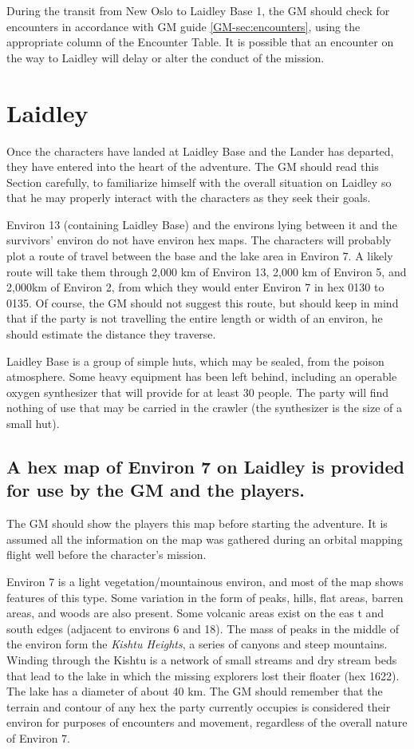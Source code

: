 During the transit from New Oslo to Laidley Base 1, the GM should
check for encounters in accordance with GM guide
\ref{GM-sec:encounters}, using the appropriate column of the Encounter
Table. It is possible that an encounter on the way to Laidley will
delay or alter the conduct of the mission.


\section{Laidley}
\label{sec:laidley}

Once the characters have landed at Laidley Base and the Lander has
departed, they have entered into the heart of the adventure. The GM
should read this Section carefully, to familiarize himself with the
overall situation on Laidley so that he may properly interact with the
characters as they seek their goals.

Environ 13 (containing Laidley Base) and the environs lying between it
and the survivors' environ do not have environ hex maps. The
characters will probably plot a route of travel between the base and
the lake area in Environ 7. A likely route will take them through
2,000 km of Environ 13, 2,000 km of Environ 5, and 2,000km of Environ
2, from which they would enter Environ 7 in hex 0130 to 0135.  Of
course, the GM should not suggest this route, but should keep in mind
that if the party is not travelling the entire length or width of an
environ, he should estimate the distance they traverse.

Laidley Base is a group of simple huts, which may be sealed, from the
poison atmosphere. Some heavy equipment has been left behind,
including an operable oxygen synthesizer that will provide for at
least 30 people. The party will find nothing of use that may be
carried in the crawler (the synthesizer is the size of a small hut).


\subsection[Environ 7 Hex Map]{A hex map of Environ 7 on Laidley is
  provided for use by 
  the GM and the players.}
\label{sec:hex-map-environ}

The GM should show the players this map before starting the adventure.
It is assumed all the information on the map was gathered during an
orbital mapping flight well before the character's mission.

Environ 7 is a light vegetation/mountainous environ, and most of the
map shows features of this type. Some variation in the form of peaks,
hills, flat areas, barren areas, and woods are also present. Some
volcanic areas exist on the eas t and south edges (adjacent to
environs 6 and 18). The mass of peaks in the middle of the environ
form the \emph{Kishtu Heights}, a series of canyons and steep
mountains.  Winding through the Kishtu is a network of small streams
and dry stream beds that lead to the lake in which the missing
explorers lost their floater (hex 1622). The lake has a diameter of
about 40 km. The GM should remember that the terrain and contour of
any hex the party currently occupies is considered their environ for
purposes of encounters and movement, regardless of the overall nature
of Environ 7.


